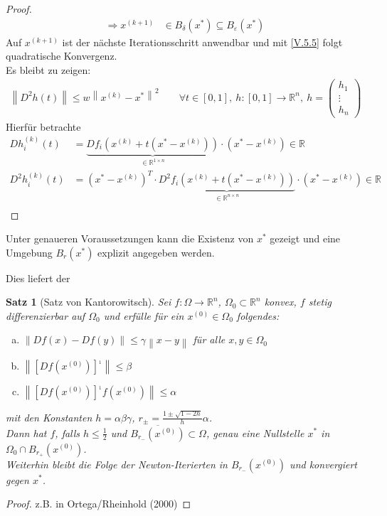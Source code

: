 \documentclass[ngerman,fontsize=11pt, paper=a4, parskip=half, titlepage=true, toc=bib]{scrbook}
\theoremstyle{definition}
\theoremstyle{plain}
\newtheorem{Satz}[Def]{Satz}		%
\newcommand{\R}{\mathds{R}}
\newcommand{\Ren}{\mathds{R}^{n}}
\newcommand{\nn}[1]{\left\| #1 \right\|}
\newenvironment{Satze}[1][]{ %
	\begin{Satz}[#1]
}
{
	\end{Satz}
	\addtocounter{subsection}{1}
}
\begin{document}
\begin{proof}
\begin{align*}
      \Rightarrow x^{(k+1)}&\in B_\delta(x^{*})\subseteq B_\varepsilon(x^{*})
    \end{align*}
    Auf $x^{(k+1)} $ ist der nächste Iterationsschritt anwendbar
    und mit \eqref{V.5.5} folgt quadratische Konvergenz.\\
    Es bleibt zu zeigen:
    \begin{gather*}
      \nn{D^2h(t)} \leq w\nn{x^{(k)}-x^{*}}^2 \qquad \forall t\in [0,1],~
      h:[0,1]\rightarrow\Ren,~ h=\begin{pmatrix} h_1 \\ \vdots \\ h_n \end{pmatrix}
    \end{gather*}
    Hierfür betrachte
    \begin{align*}
      Dh_i^{(k)}(t)&=\underbrace{Df_i\left( x^{(k)}+t(x^{*}-x^{(k)})\right)}_{\in \R^{1\times n}}
                     \cdot (x^{*}-x^{(k)})\in\R\\
      D^2h_i^{(k)}(t)&=(x^{*}-x^{(k)})^T\cdot
                       \underbrace{D^2f_i\left( x^{(k)}+t(x^{*}-x^{(k)})\right)}_{\in \R^{n\times n}}
                       \cdot (x^{*}-x^{(k)})\in\R\\
    \end{align*}
  \end{proof}
  
  Unter genaueren Voraussetzungen kann die Existenz von $x^{*}$ gezeigt 
  und eine Umgebung $B_r(x^{*})$ explizit angegeben werden.
  
  Dies liefert der 
  \begin{Satze}[Satz von Kantorowitsch]
  Sei $f:\Omega\rightarrow \Ren$, $\Omega_0 \subset \Ren$ konvex,
  $f$ stetig differenzierbar auf $\Omega_0$ und 
  erfülle für ein $x^{(0)}\in \Omega_0$ folgendes:
  \begin{enumerate}[a)]
  \item $\nn{Df(x) -Df(y)}\leq \gamma \nn{x-y}$ für alle $x,y\in \Omega_0$
  \item $\nn{[Df(x^{(0)})]^{_1}} \leq \beta$
  \item $\nn{[Df(x^{(0)})]^{_1}f(x^{(0)})} \leq \alpha$
  \end{enumerate}
  mit den Konstanten $h=\alpha\beta\gamma$, $r_\pm = \frac{1\pm \sqrt{1-2h}}{h}\alpha$.\\
  Dann hat $f$, falls $h\leq \frac{1}{2}$ und $\overline{B_{r_{-}}(x^{(0)})}\subset \Omega$,
  genau eine Nullstelle $x^{*}$ in $\Omega_0\cap B_{r_+}(x^{(0)})$.\\
  Weiterhin bleibt die Folge der Newton-Iterierten in $B_{r_{-}}(x^{(0)})$
  und konvergiert gegen $x^{*}$.
  \end{Satze}
  \begin{proof}
    z.B. in Ortega/Rheinhold (2000)
  \end{proof}
  
\end{document}

